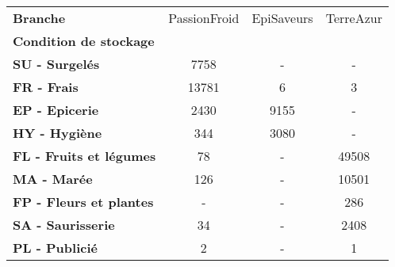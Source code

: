 \begin{tabular}{lccc}
\toprule
\textbf{Branche} & PassionFroid & EpiSaveurs & TerreAzur \\
\textbf{Condition de stockage } &              &            &           \\
\midrule
\textbf{SU - Surgelés         } &         7758 &          - &         - \\
\textbf{FR - Frais            } &        13781 &          6 &         3 \\
\textbf{EP - Epicerie         } &         2430 &       9155 &         - \\
\textbf{HY - Hygiène          } &          344 &       3080 &         - \\
\textbf{FL - Fruits et légumes} &           78 &          - &     49508 \\
\textbf{MA - Marée            } &          126 &          - &     10501 \\
\textbf{FP - Fleurs et plantes} &            - &          - &       286 \\
\textbf{SA - Saurisserie      } &           34 &          - &      2408 \\
\textbf{PL - Publicié         } &            2 &          - &         1 \\
\bottomrule
\end{tabular}
